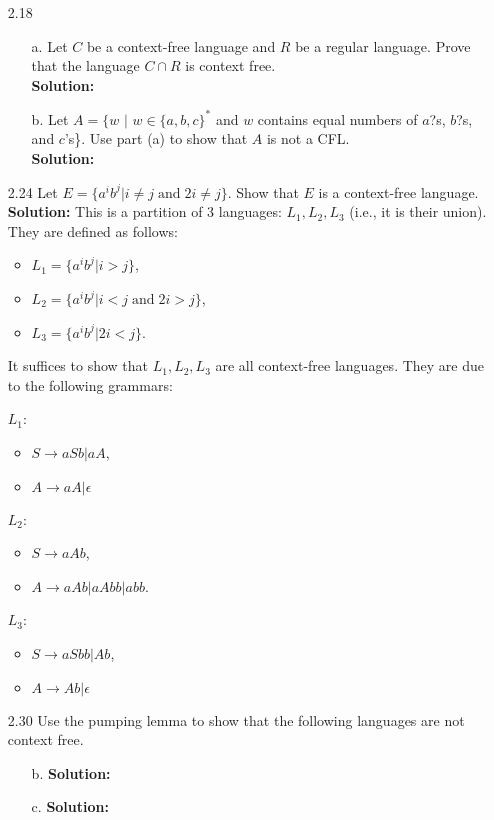 \begin{enumerate}
\item[2.18]
\begin{enumerate}
\item[a.]Let $C$ be a context-free language and $R$ be a regular language. Prove that the language $C \cap R$ is context free.
\\
\textbf{Solution:} \alreadyanswered

\item[b.]Let $A = \{w$ $|$ $w \in \{a, b, c\}^*$ and $w$ contains equal numbers of $a$?s, $b$?s, and $c$'s\}. Use part (a) to show that $A$ is not a CFL.
\\
\textbf{Solution:} \alreadyanswered
\end{enumerate}

\item[2.24]Let $E = \{a^ib^j \vert i \ne j\;\text{and}\;2i \ne j\}$. Show that $E$ is a context-free language.
\\
\textbf{Solution:} This is a partition of 3 languages: $L_1, L_2, L_3$ (i.e., it is their union). They are defined as follows: 
\begin{itemize}
\item $L_1 = \{a^ib^j \vert i > j\}$,
\item $L_2 = \{a^ib^j \vert i < j\;\text{and}\;2i > j\}$,
\item $L_3 = \{a^ib^j \vert 2i < j\}$.
\end{itemize}
It suffices to show that $L_1, L_2, L_3$ are all context-free languages. They are due to the following grammars:
\par $L_1$:
\begin{itemize}
\item $S \to aSb \vert aA$,
\item $A \to aA \vert \epsilon$
\end{itemize}
\par $L_2$:
\begin{itemize}
\item $S \to aAb$,
\item $A \to aAb \vert aAbb \vert abb$.
\end{itemize}
\par $L_3$:
\begin{itemize}
\item $S \to aSbb \vert Ab$,
\item $A \to Ab \vert \epsilon$
\end{itemize}

\item[2.30]Use the pumping lemma to show that the following languages are not context free.
\begin{enumerate}
\item[b.]\textbf{Solution:} \alreadyanswered
\item[c.]\textbf{Solution:} \alreadyanswered
\end{enumerate}


\end{enumerate}
